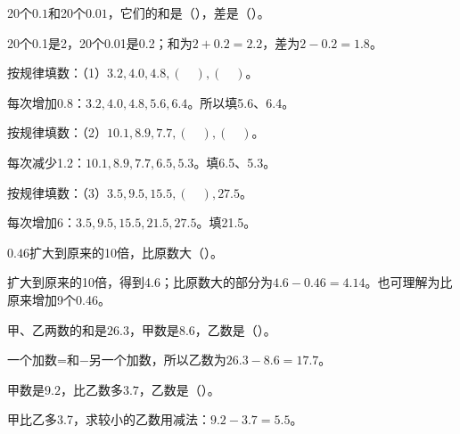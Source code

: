 20个\(0.1\)和20个\(0.01\)，它们的和是（\hspace{1.8em}），差是（\hspace{1.8em}）。\par
\begin{BookAnswer}
20个0.1是2，20个0.01是0.2；和为\(2+0.2=2.2\)，差为\(2-0.2=1.8\)。
\end{BookAnswer}

按规律填数：（1）\(3.2,4.0,4.8,(\quad),(\quad)\)。\par
\begin{BookAnswer}
每次增加0.8：\(3.2,4.0,4.8,5.6,6.4\)。所以填5.6、6.4。
\end{BookAnswer}

按规律填数：（2）\(10.1,8.9,7.7,(\quad),(\quad)\)。\par
\begin{BookAnswer}
每次减少1.2：\(10.1,8.9,7.7,6.5,5.3\)。填6.5、5.3。
\end{BookAnswer}

按规律填数：（3）\(3.5,9.5,15.5,(\quad),27.5\)。\par
\begin{BookAnswer}
每次增加6：\(3.5,9.5,15.5,21.5,27.5\)。填21.5。
\end{BookAnswer}

\(0.46\)扩大到原来的10倍，比原数大（\hspace{1.8em}）。\par
\begin{BookAnswer}
扩大到原来的10倍，得到4.6；比原数大的部分为\(4.6-0.46=4.14\)。也可理解为比原来增加9个0.46。
\end{BookAnswer}

甲、乙两数的和是\(26.3\)，甲数是\(8.6\)，乙数是（\hspace{1.8em}）。\par
\begin{BookAnswer}
一个加数=和−另一个加数，所以乙数为\(26.3-8.6=17.7\)。
\end{BookAnswer}

甲数是\(9.2\)，比乙数多\(3.7\)，乙数是（\hspace{1.8em}）。\par
\begin{BookAnswer}
甲比乙多3.7，求较小的乙数用减法：\(9.2-3.7=5.5\)。
\end{BookAnswer}

